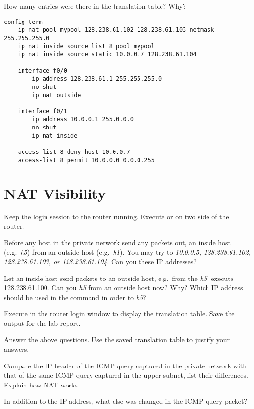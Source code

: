 \documentclass{../UTNetLab}
\begin{document}
    \begin{report}
        \item How many entries were there in the translation table? Why?
    \end{report}

    \begin{lstlisting}[language={cisco}, emph={mypool}, caption={NAT Router Configuration in \hyperref[fig:8.7]{Figure~8.7} (Table~8.5)\label{tab:8.5}}]
config term
    ip nat pool mypool 128.238.61.102 128.238.61.103 netmask 255.255.255.0
    ip nat inside source list 8 pool mypool
    ip nat inside source static 10.0.0.7 128.238.61.104

    interface f0/0
        ip address 128.238.61.1 255.255.255.0
        no shut
        ip nat outside

    interface f0/1
        ip address 10.0.0.1 255.0.0.0
        no shut
        ip nat inside

    access-list 8 deny host 10.0.0.7
    access-list 8 permit 10.0.0.0 0.0.0.255
    \end{lstlisting}

\section{NAT Visibility}
    Keep the login session to the router running.
    Execute  or  on two side of the router.

    Before any host in the private network send any packets out,  an inside host (e.g.\ \textit{h5}) from an outside host (e.g.\ \textit{h1}).
    You may try to  \textit{10.0.0.5, 128.238.61.102, 128.238.61.103, or 128.238.61.104}.
    Can you  these IP addresses?

    Let an inside host send packets to an outside host, e.g.\ from the \textit{h5}, execute  128.238.61.100.
    Can you  \textit{h5} from an outside host now? Why? Which IP address should be used in the  command in order to  \textit{h5}?

    Execute  in the router login window to display the translation table.
    Save the output for the lab report.

    \begin{report}
        \item Answer the above questions.
            Use the saved translation table to justify your answers.

        \item Compare the IP header of the ICMP query captured in the private network with that of the same ICMP query captured in the upper subnet, list their differences.
            Explain how NAT works.

        \item In addition to the IP address, what else was changed in the ICMP query packet?
    \end{report}
\end{document}
